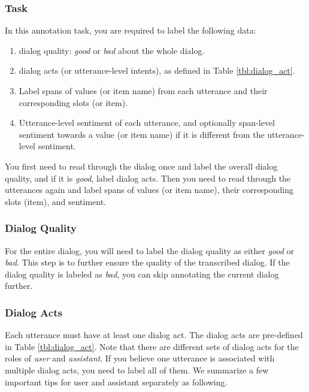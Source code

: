 \documentclass[11pt,a4paper]{article}
\begin{document}
\subsubsection{Task}
In this annotation task, you are required to label the following data: 
\begin{enumerate}
\itemsep0em
    \item dialog quality: \textit{good} or \textit{bad} about the whole dialog.
    \item dialog acts (or utterance-level intents), as defined in Table \ref{tbl:dialog_act}.
    \item Label spans of values (or item name) from each utterance and their corresponding slots (or item).
    \item Utterance-level sentiment of each utterance, and optionally span-level sentiment towards a value (or item name) if it is different from the utterance-level sentiment.
\end{enumerate}

You first need to read through the dialog once and label the overall dialog quality, and if it is \textit{good}, label dialog acts.
Then you need to read through the utterances again and label spans of values (or item name), their corresponding slots (item), and sentiment.

\subsubsection{Dialog Quality}
For the entire dialog, you will need to label the dialog quality as either \textit{good} or \textit{bad}. This step is to further ensure the quality of the transcribed dialog. If the dialog quality is labeled as \textit{bad}, you can skip annotating the current dialog further.

\subsubsection{Dialog Acts}
Each utterance must have at least one dialog act. 
The dialog acts are pre-defined in Table \ref{tbl:dialog_act}.
Note that there are different sets of dialog acts for the roles of \textit{user} and \textit{assistant}.
If you believe one utterance is associated with multiple dialog acts, you need to label all of them. We summarize a few important tips for user and assistant separately as following.
\end{document}
